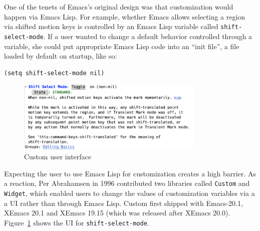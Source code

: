 \documentclass[format=acmsmall, review]{acmart}
\newcommand \Elisp {Emacs Lisp}
\begin{document}
One of the tenets of Emacs's original design was that customization
would happen via \Elisp.  For example, whether Emacs allows selecting
a region via shifted motion keys is controlled by an \Elisp{} variable
called \texttt{shift-select-mode}.  If a user wanted to change a default
behavior controlled through a variable, she could put appropriate
\Elisp{} code into an ``init file'', a file loaded by default on
startup, like so:
%
\begin{verbatim}
(setq shift-select-mode nil)
\end{verbatim}
%
\begin{figure}[tb]
  \centering
  \includegraphics[width=0.8\textwidth]{custom}  
  \caption{Custom user interface}
  \label{fig:custom}
\end{figure}
%
Expecting the user to use \Elisp{} for customization creates a high
barrier.  As a reaction, Per Abrahamsen in 1996 contributed two
libraries called \texttt{Custom} and \texttt{Widget}, which enabled
users to change the values of customization variables via a a UI
rather than through \Elisp{}.  Custom first shipped with Emacs-20.1, XEmacs
20.1 and XEmacs 19.15 (which was released after XEmacs 20.0).
Figure~\ref{fig:custom} shows the UI
for \texttt{shift-select-mode}.
\end{document}

